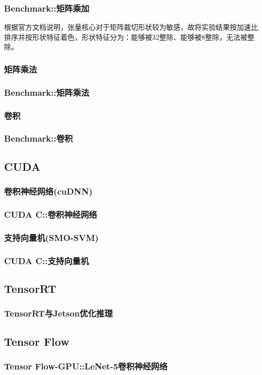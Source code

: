 \documentclass[10pt,aspectratio=169,mathserif]{beamer}
\begin{document}
	\begin{frame}
		\frametitle{Benchmark::矩阵乘加}
		根据官方文档说明，张量核心对于矩阵裁切形状较为敏感，故将实验结果按加速比排序并按形状特征着色，形状特征分为：能够被32整除、能够被8整除，无法被整除。
	\end{frame}

	\subsubsection{矩阵乘法}
	\begin{frame}
		\frametitle{Benchmark::矩阵乘法}
	\end{frame}
	\subsubsection{卷积}
	\begin{frame}
		\frametitle{Benchmark::卷积}
	\end{frame}
	\subsection{CUDA}
	\subsubsection{卷积神经网络(cuDNN)}
	\begin{frame}
		\frametitle{CUDA C::卷积神经网络}
	\end{frame}
	\subsubsection{支持向量机(SMO-SVM)}
	\begin{frame}
		\frametitle{CUDA C::支持向量机}
	\end{frame}
	
	\subsection{TensorRT}
	\begin{frame}
		\frametitle{TensorRT与Jetson优化推理}
	\end{frame}
	
	\subsection{Tensor Flow}
	\begin{frame}
		\frametitle{Tensor Flow-GPU::LeNet-5卷积神经网络}
	\end{frame}
	
\end{document}
